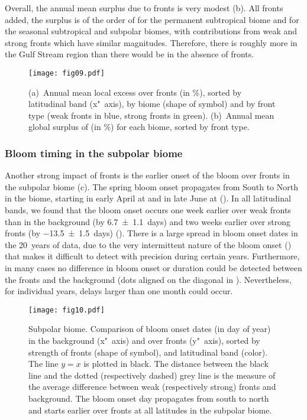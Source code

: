 Overall, the annual mean  surplus due to fronts is very modest (b).
All fronts added, the surplus is of the order of  for the permanent subtropical biome and  for the seasonal subtropical and subpolar biomes, with contributions from weak and strong fronts which have similar magnitudes.
Therefore, there is roughly  more  in the Gulf Stream region than there would be in the absence of fronts.

\begin{figure*}
  \centering
  \texttt{[image: fig09.pdf]}
  \caption[Recap of local and global impact of fronts on Chl-\textit{a}]{
    (a)~Annual mean local  excess over fronts (in \%), sorted by latitudinal band (x"~axis), by biome (shape of symbol) and by front type (weak fronts in blue, strong fronts in green).
    (b)~Annual mean global surplus of  (in \%) for each biome, sorted by front type.
  }%
  \label{fig:recap}
\end{figure*}


\subsubsection{Bloom timing in the subpolar biome}

Another strong impact of fronts is the earlier onset of the bloom over fronts in the subpolar biome (c).
The spring bloom onset propagates from South to North in the biome, starting in early April at  and in late June at  ().
In all latitudinal bands, we found that the bloom onset occurs one week earlier over weak fronts than in the background (by \num{6.7 \pm 1.1}~days) and two weeks earlier over strong fronts (by \num{-13.5 \pm 1.5}~days) ().
There is a large spread in bloom onset dates in the 20~years of data, due to the very intermittent nature of the bloom onset (\cite{keerthi_2021}) that makes it difficult to detect with precision during certain years.
Furthermore, in many cases no difference in bloom onset or duration could be detected between the fronts and the background (dots aligned on the diagonal in ).
Nevertheless, for individual years, delays larger than one month could occur.

\begin{figure}
  \centering
  \texttt{[image: fig10.pdf]}
  \caption[Comparison of bloom onset dates in the background and over fronts]{
    Subpolar biome. Comparison of bloom onset dates (in day of year) in the background (x"~axis) and over fronts (y"~axis), sorted by strength of fronts (shape of symbol), and latitudinal band (color).
    The line \(y=x\) is plotted in black.
    The distance between the black line and the dotted (respectively dashed) grey line is the measure of the average difference between weak (respectively strong) fronts and background.
    The bloom onset day propagates from south to north and starts earlier over fronts at all latitudes in the subpolar biome.
  }%
  \label{fig:bloom}
\end{figure}


